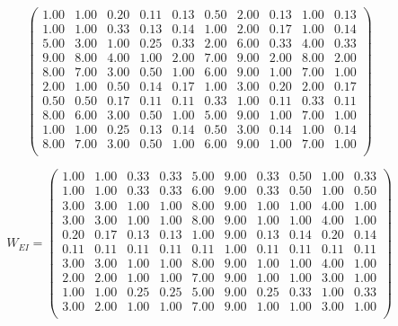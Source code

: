 \documentclass{mcmthesis}
\begin{document}
\begin{appendices}
\[\begin{pmatrix}
1.00 	&	1.00 	&	0.20 	&	0.11 	&	0.13 	&	0.50 	&	2.00 	&	0.13 	&	1.00 	&	0.13 \\
1.00 	&	1.00 	&	0.33 	&	0.13 	&	0.14 	&	1.00 	&	2.00 	&	0.17 	&	1.00 	&	0.14 \\
5.00 	&	3.00 	&	1.00 	&	0.25 	&	0.33 	&	2.00 	&	6.00 	&	0.33 	&	4.00 	&	0.33 \\
9.00 	&	8.00 	&	4.00 	&	1.00 	&	2.00 	&	7.00 	&	9.00 	&	2.00 	&	8.00 	&	2.00 \\
8.00 	&	7.00 	&	3.00 	&	0.50 	&	1.00 	&	6.00 	&	9.00 	&	1.00 	&	7.00 	&	1.00 \\
2.00 	&	1.00 	&	0.50 	&	0.14 	&	0.17 	&	1.00 	&	3.00 	&	0.20 	&	2.00 	&	0.17 \\
0.50 	&	0.50 	&	0.17 	&	0.11 	&	0.11 	&	0.33 	&	1.00 	&	0.11 	&	0.33 	&	0.11 \\
8.00 	&	6.00 	&	3.00 	&	0.50 	&	1.00 	&	5.00 	&	9.00 	&	1.00 	&	7.00 	&	1.00 \\
1.00 	&	1.00 	&	0.25 	&	0.13 	&	0.14 	&	0.50 	&	3.00 	&	0.14 	&	1.00 	&	0.14 \\
8.00 	&	7.00 	&	3.00 	&	0.50 	&	1.00 	&	6.00 	&	9.00 	&	1.00 	&	7.00 	&	1.00 \\
\end{pmatrix}
\]

\[W_{EI}=
\begin{pmatrix}
1.00    &	1.00    &   0.33 	&	0.33 	&	5.00 	&	9.00 	&	0.33 	&	0.50 	&	1.00 	&	0.33 \\
1.00    &   1.00    &   0.33 	&	0.33 	&	6.00 	&	9.00 	&	0.33 	&	0.50 	&	1.00 	&	0.50 \\
3.00    &   3.00    &   1.00 	&	1.00 	&	8.00 	&	9.00 	&	1.00 	&	1.00 	&	4.00 	&	1.00 \\
3.00    &   3.00    &   1.00 	&	1.00 	&	8.00 	&	9.00 	&	1.00 	&	1.00 	&	4.00 	&	1.00 \\
0.20    &   0.17    &   0.13 	&	0.13 	&	1.00 	&	9.00 	&	0.13 	&	0.14 	&	0.20 	&	0.14 \\
0.11    &   0.11    &   0.11 	&	0.11 	&	0.11 	&	1.00 	&	0.11 	&	0.11 	&	0.11 	&	0.11 \\
3.00    &   3.00    &   1.00 	&	1.00 	&	8.00 	&	9.00 	&	1.00 	&	1.00 	&	4.00 	&	1.00 \\
2.00    &   2.00    &   1.00 	&	1.00 	&	7.00 	&	9.00 	&	1.00 	&	1.00 	&	3.00 	&	1.00 \\
1.00    &   1.00    &   0.25 	&	0.25 	&	5.00 	&	9.00 	&	0.25 	&	0.33 	&	1.00 	&	0.33 \\
3.00    &   2.00    &   1.00 	&	1.00 	&	7.00 	&	9.00 	&	1.00 	&	1.00 	&	3.00 	&	1.00 \\


\end{pmatrix}\]
\end{appendices}
\end{document}
